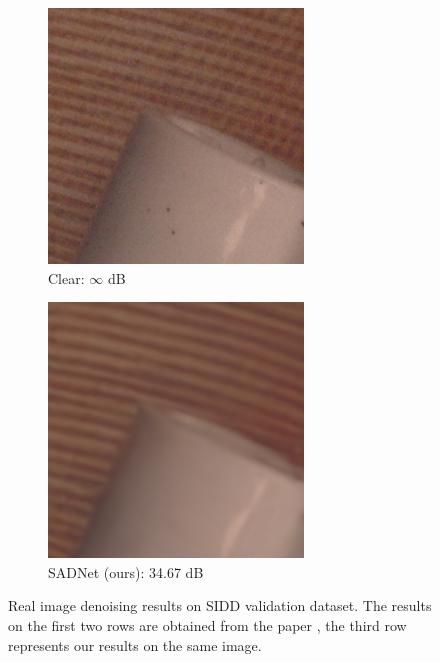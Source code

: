 \begin{figure}[b!]
\begin{subfigure}{0.3\textwidth}
            \includegraphics[width=\linewidth]{images/bardak_gt.png}
            \caption{Clear: $\infty$ dB}
            \label{fig:bardak_clear}
        \end{subfigure}\hfil %
        \begin{subfigure}{0.3\textwidth}
            \includegraphics[width=\linewidth]{images/bardak_out.png}
            \caption{SADNet (ours): 34.67 dB}
            \label{fig:bardak_out}
        \end{subfigure}\hfil %
    \caption{Real image denoising results on SIDD validation dataset. The results on the first two rows are obtained from the paper \cite{10.1007/978-3-030-58577-8_11},  the third row represents our results on the same image.}
    \label{fig:bardak}
\end{figure}


